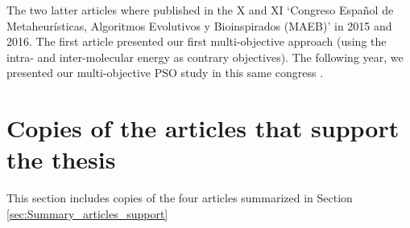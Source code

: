 The two latter articles where published in the X and XI `Congreso Español de Metaheurísticas, Algoritmos Evolutivos y Bioinspirados (MAEB)' in 2015 and 2016. The first article \cite{lopez2015maeb} presented our first multi-objective approach (using the intra- and inter-molecular energy as contrary objectives). The following year, we presented our multi-objective PSO study in this same congress \cite{lopez2016maeb}.

\section{Copies of the articles that support the thesis}

This section includes copies of the four articles summarized in Section \ref{sec:Summary_articles_support}








